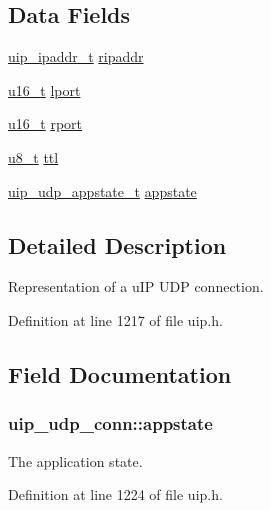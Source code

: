 \subsection*{Data Fields}
\begin{DoxyCompactItemize}
\item 
\hyperlink{group__uip_ga1ef35301f43a5bbb9f89f07b5a36b9a0}{uip\_\-ipaddr\_\-t} \hyperlink{structuip__udp__conn_a8a661a2d544100b82d0d14a1985083d5}{ripaddr}
\item 
\hyperlink{group__uipfw_ga77570ac4fcab86864fa1916e55676da2}{u16\_\-t} \hyperlink{structuip__udp__conn_a981392e295db4d024eea95805c51c371}{lport}
\item 
\hyperlink{group__uipfw_ga77570ac4fcab86864fa1916e55676da2}{u16\_\-t} \hyperlink{structuip__udp__conn_a280a0c2a93544e597f92bbacf36ee1dc}{rport}
\item 
\hyperlink{group__uipfw_ga4caecabca98b43919dd11be1c0d4cd8e}{u8\_\-t} \hyperlink{structuip__udp__conn_a4da1d7815516cd2b5bda3a66fdf05198}{ttl}
\item 
\hyperlink{structdhcpc__state}{uip\_\-udp\_\-appstate\_\-t} \hyperlink{structuip__udp__conn_ac8afa29e0aa5e789d6929b366d98ba56}{appstate}
\end{DoxyCompactItemize}


\subsection{Detailed Description}
Representation of a uIP UDP connection. 

Definition at line 1217 of file uip.h.



\subsection{Field Documentation}
\hypertarget{structuip__udp__conn_ac8afa29e0aa5e789d6929b366d98ba56}{
\subsubsection[{appstate}]{ {\bf uip\_\-udp\_\-conn::appstate}}}
\label{structuip__udp__conn_ac8afa29e0aa5e789d6929b366d98ba56}
The application state. 

Definition at line 1224 of file uip.h.

